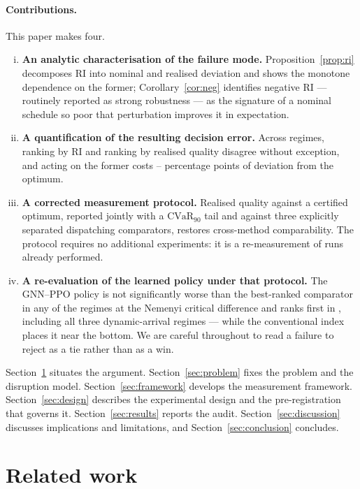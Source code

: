 \documentclass[a4paper,fleqn]{cas-sc}
\newcommand{\RI}{\mathrm{RI}}
\newcommand{\CVaR}{\mathrm{CVaR}}
\begin{document}
\paragraph{Contributions.} This paper makes four.
\begin{enumerate}[(i)]
\item \textbf{An analytic characterisation of the failure mode.}
Proposition~\ref{prop:ri} decomposes $\RI$ into nominal and realised deviation
and shows the monotone dependence on the former; Corollary~\ref{cor:neg}
identifies negative $\RI$ --- routinely reported as strong robustness --- as the
signature of a nominal schedule so poor that perturbation improves it in
expectation.
\item \textbf{A quantification of the resulting decision error.} Across
\NRegimes{} regimes, ranking by $\RI$ and ranking by realised quality disagree
without exception, and acting on the former costs \PenaltyMin{}--\PenaltyMax{}
percentage points of deviation from the optimum.
\item \textbf{A corrected measurement protocol.} Realised quality against a
certified optimum, reported jointly with a $\CVaR_{90}$ tail and against three
explicitly separated dispatching comparators, restores cross-method
comparability. The protocol requires no additional experiments: it is a
re-measurement of runs already performed.
\item \textbf{A re-evaluation of the learned policy under that protocol.} The
GNN--PPO policy is not significantly worse than the best-ranked comparator in
any of the \NRegimes{} regimes at the Nemenyi critical difference and ranks
first in \NRLBest{}, including all three dynamic-arrival regimes --- while the
conventional index places it near the bottom. We are careful throughout to read
a failure to reject as a tie rather than as a win.
\end{enumerate}

Section~\ref{sec:related} situates the argument. Section~\ref{sec:problem}
fixes the problem and the disruption model. Section~\ref{sec:framework} develops
the measurement framework. Section~\ref{sec:design} describes the experimental
design and the pre-registration that governs it. Section~\ref{sec:results}
reports the audit. Section~\ref{sec:discussion} discusses implications and
limitations, and Section~\ref{sec:conclusion} concludes.

\section{Related work}\label{sec:related}
\end{document}
